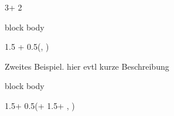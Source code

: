 \documentclass{beamer}
\newlength{\blockThree}
\begin{document}
\begin{frame}[t]
\begin{textblock*}{3\colwidth + 2\colsep}
\begin{alertblock}
\begin{beamercolorbox}[
    wd=0.88\linewidth,
    sep=0.25cm,
    center
]{block body}
\end{beamercolorbox}


\end{alertblock}

\end{textblock*}



\begin{textblock*}{1.5 \colwidth + 0.5\colsep}(\leftmargin, \blockThree)

\begin{alertblock}{%
	\begin{minipage}[b]{60pt}
		\RaggedRight
		\noindent\hspace{-10pt}
	\end{minipage}%
	\begin{minipage}[b]{2\colwidth+\colsep-125pt}\strut%
		Zweites Beispiel.\; {\mdseries hier evtl kurze Beschreibung}
	\end{minipage}%
}
	\begin{beamercolorbox}[
		ht = 12.75cm, 
		wd = 0.9\linewidth, 
		center
		]{block body}
		\par
	\end{beamercolorbox}
\end{alertblock}

\end{textblock*}




\begin{textblock*}{1.5\colwidth + 0.5\colsep}(\leftmargin + 1.5\colwidth + \colsep, \blockThree)


\end{textblock*}
\end{frame}
\end{document}
